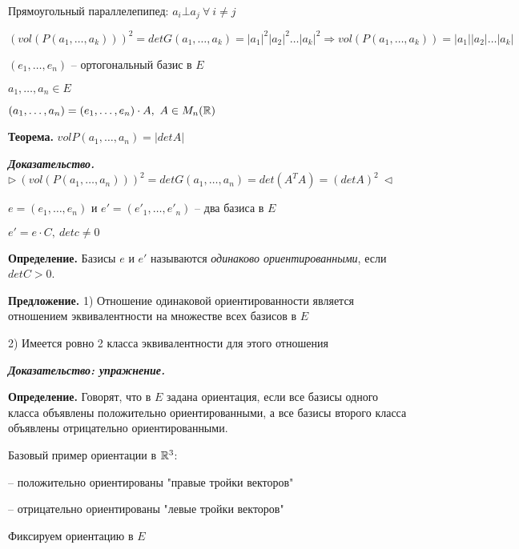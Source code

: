 Прямоугольный параллелепипед: $a_i \bot a_j \ \forall \ i \neq j$

$(vol(P(a_1, \dots, a_k)))^2 = det G(a_1, \dots, a_k) = |a_1|^2 |a_2|^2 \dots |a_k|^2 \Rightarrow vol(P(a_1, \dots, a_k)) = |a_1||a_2| \dots |a_k|$

\vspace{\baselineskip}
$(e_1, \dots, e_n)$ -- ортогональный базис в $E$

$a_1, \dots, a_n \in E$

$(a_1, \dots, a_n) = (e_1, \dots, e_n) \cdot A, \ A \in M_n (\mathbb{R})$

\vspace{\baselineskip}
\textbf{Теорема.} $vol P(a_1, \dots, a_n) = |det A|$

\vspace{\baselineskip}
\textbf{\textit{Доказательство.}} $\rhd \ (vol(P(a_1, \dots, a_n)))^2 = det G(a_1, \dots, a_n) = det (A^T A) = (det A)^2 \ \lhd$

\vspace{\baselineskip}
$e = (e_1, \dots, e_n)$ и $e' = (e'_1, \dots, e'_n)$ -- два базиса в $E$

$e' = e \cdot C, \ detc \neq 0$

\vspace{\baselineskip}
\textbf{Определение.} Базисы $e$ и $e'$ называются \textit{одинаково ориентированными}, если $detC > 0$.

\vspace{\baselineskip}
\textbf{Предложение.} 1) Отношение одинаковой ориентированности является отношением эквивалентности на множестве всех базисов в $E$

2) Имеется ровно 2 класса эквивалентности для этого отношения

\vspace{\baselineskip}
\textbf{\textit{Доказательство: упражнение.}}

\vspace{\baselineskip}
\textbf{Определение.} Говорят, что в $E$ задана ориентация, если все базисы одного класса объявлены положительно ориентированными, а все базисы второго класса объявлены отрицательно ориентированными.

\vspace{\baselineskip}
Базовый пример ориентации в $\mathbb{R}^3$:

-- положительно ориентированы "правые тройки векторов"

-- отрицательно ориентированы "левые тройки векторов"

\vspace{\baselineskip}
Фиксируем ориентацию в $E$

